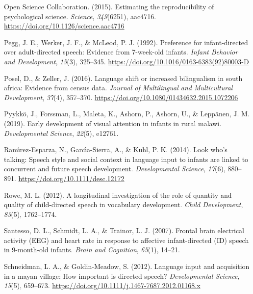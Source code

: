 \documentclass[
  ,man,floatsintext]{apa6}
\newlength{\cslhangindent}
\newlength{\cslentryspacingunit} %
\newenvironment{CSLReferences}[2] %
 {%
  \setlength{\parindent}{0pt}
  \ifodd #1
  \let\oldpar\par
  \def\par{\hangindent=\cslhangindent\oldpar}
  \fi
  \setlength{\parskip}{#2\cslentryspacingunit}
 }%
 {}
\begin{document}
\begin{CSLReferences}{1}{0}
\leavevmode{}%
Open Science Collaboration. (2015). Estimating the reproducibility of psychological science. \emph{Science}, \emph{349}(6251), aac4716. \url{https://doi.org/10.1126/science.aac4716}

\leavevmode{}%
Pegg, J. E., Werker, J. F., \& McLeod, P. J. (1992). Preference for infant-directed over adult-directed speech: Evidence from 7-week-old infants. \emph{Infant Behavior and Development}, \emph{15}(3), 325--345. \url{https://doi.org/10.1016/0163-6383(92)80003-D}

\leavevmode{}%
Posel, D., \& Zeller, J. (2016). Language shift or increased bilingualism in south africa: Evidence from census data. \emph{Journal of Multilingual and Multicultural Development}, \emph{37}(4), 357--370. \url{https://doi.org/10.1080/01434632.2015.1072206}

\leavevmode{}%
Pyykkö, J., Forssman, L., Maleta, K., Ashorn, P., Ashorn, U., \& Leppänen, J. M. (2019). Early development of visual attention in infants in rural malawi. \emph{Developmental Science}, \emph{22}(5), e12761.

\leavevmode{}%
Ramı́rez-Esparza, N., Garcı́a-Sierra, A., \& Kuhl, P. K. (2014). Look who's talking: Speech style and social context in language input to infants are linked to concurrent and future speech development. \emph{Developmental Science}, \emph{17}(6), 880--891. \url{https://doi.org/10.1111/desc.12172}

\leavevmode{}%
Rowe, M. L. (2012). A longitudinal investigation of the role of quantity and quality of child-directed speech in vocabulary development. \emph{Child Development}, \emph{83}(5), 1762--1774.

\leavevmode{}%
Santesso, D. L., Schmidt, L. A., \& Trainor, L. J. (2007). Frontal brain electrical activity (EEG) and heart rate in response to affective infant-directed (ID) speech in 9-month-old infants. \emph{Brain and Cognition}, \emph{65}(1), 14--21.

\leavevmode{}%
Schneidman, L. A., \& Goldin-Meadow, S. (2012). Language input and acquisition in a mayan village: How important is directed speech? \emph{Developmental Science}, \emph{15}(5), 659--673. \url{https://doi.org/10.1111/j.1467-7687.2012.01168.x}


\end{CSLReferences}
\end{document}
